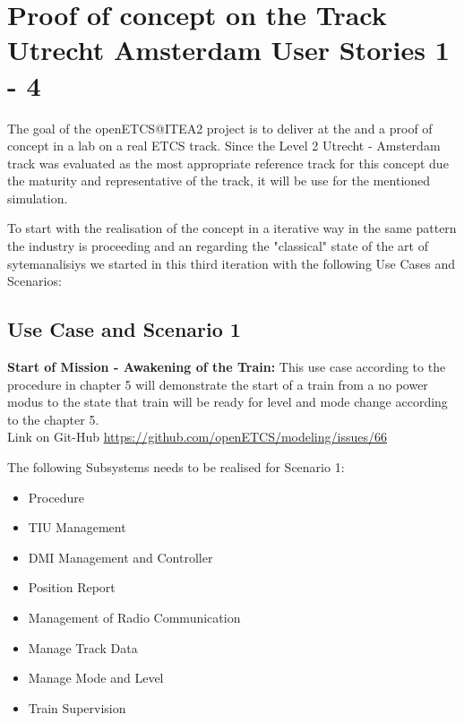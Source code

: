 
\section{Proof of concept on the Track Utrecht Amsterdam User Stories 1 - 4}

The goal of the openETCS@ITEA2 project is to deliver at the and a proof of concept in a lab on a real ETCS track. Since the Level 2 Utrecht - Amsterdam track was evaluated as the most appropriate reference track for this concept due the maturity and representative of the track, it will be use for the mentioned simulation.

To start with the realisation of the concept in a iterative way in the same pattern the industry is proceeding and an regarding the "classical" state of the art of sytemanalisiys we started in this third iteration with the following Use Cases and Scenarios:

\subsection{Use Case and Scenario 1}
\textbf{Start of Mission - Awakening of the Train:}
This use case according to the procedure in chapter 5 will demonstrate the start of a train from a no power modus to the state that train will be ready for level and mode change according to the chapter 5.\\ 
Link on Git-Hub \url{https://github.com/openETCS/modeling/issues/66}

The following Subsystems needs to be realised for Scenario 1:\\
\begin{itemize}
\item Procedure
\item TIU Management
\item DMI Management and Controller
\item Position Report
\item Management of Radio Communication
\item Manage Track Data
\item Manage Mode and Level
\item Train Supervision
\end{itemize}

